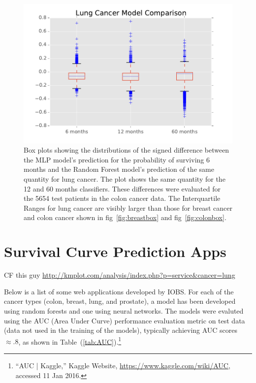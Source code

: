 \documentclass[a4paper,11pt]{article}
\begin{document}
\begin{figure}[tbp]
\centering 
\begin{center}
\includegraphics[width=.90\textwidth,origin=c]{lungbox.pdf}
\caption{\label{fig:lungbox} Box plots showing the distributions of the signed difference between the MLP model's prediction for the probability of surviving 6 months and the Random Forest model's prediction of the same quantity for lung cancer. The plot shows the same quantity for the 12 and 60 months classifiers. These differences were evaluated for the 5654 test patients in the colon cancer data. The Interquartile Ranges for lung cancer are visibly larger than those for breast cancer and colon cancer shown in fig~\ref{fig:breastbox} and fig~\ref{fig:colonbox}.}
\end{center}
\end{figure}










\section{Survival Curve Prediction Apps}

CF this guy \url{http://kmplot.com/analysis/index.php?p=service&cancer=lung}


Below is a list of some web applications developed by IOBS.
For each of the cancer types (colon, breast, lung, and prostate), a model has been developed using random forests and one using neural networks. The models were evaluted using the AUC (Area Under Curve) performance evaluation metric on test data (data not used in the training of the models), typically achieving AUC scores  $\approx .8$, as shown in Table~(\ref{tab:AUC}).\footnote{``AUC | Kaggle,'' Kaggle Website, \url{https://www.kaggle.com/wiki/AUC}, accessed 11 Jan 2016.}
\end{document}
